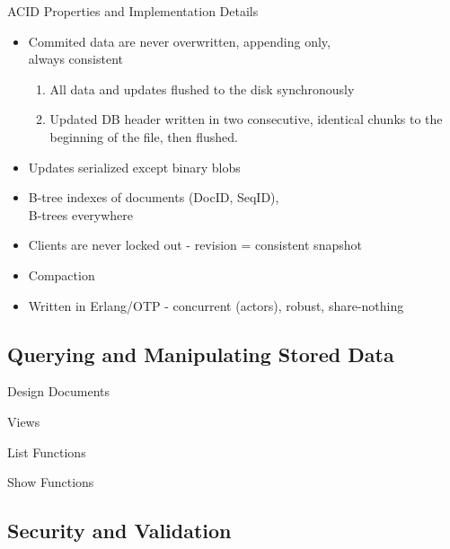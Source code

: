 \documentclass{beamer}
\begin{document}
\begin{frame}{ACID Properties and Implementation Details}
  \begin{itemize}
    \item Commited data are never overwritten, appending only,\\always consistent
    \begin{enumerate}
      \item All data and updates flushed to the disk synchronously
      \item Updated DB header written in two consecutive, identical chunks
            to the beginning of the file, then flushed.
    \end{enumerate}
    \item Updates serialized except binary blobs
    \item B-tree indexes of documents (DocID, SeqID),\\B-trees everywhere
    \item Clients are never locked out - revision = consistent snapshot
    \item Compaction
    \item Written in Erlang/OTP - concurrent (actors), robust, share-nothing
  \end{itemize}
\end{frame}

\subsection{Querying and Manipulating Stored Data}
\begin{frame}{Design Documents}
\end{frame}

\begin{frame}{Views}
\end{frame}

\begin{frame}{List Functions}
\end{frame}

\begin{frame}{Show Functions}
\end{frame}

\subsection{Security and Validation}
\begin{frame}
\end{frame}
\end{document}
